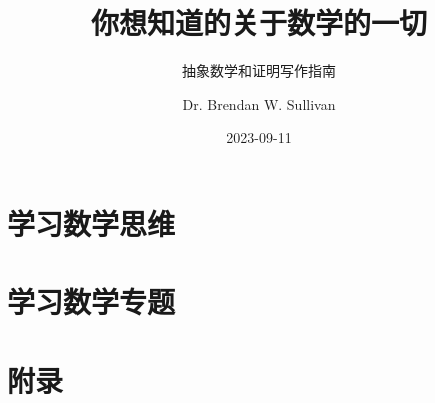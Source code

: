 \documentclass[lang=cn,color=green,10pt]{elegantbook}
\title{你想知道的关于数学的一切}
\subtitle{抽象数学和证明写作指南}
\author{Dr. Brendan W. Sullivan}
\date{2023-09-11}
\begin{document}
\maketitle
\frontmatter

\tableofcontents

\mainmatter

\part{学习数学思维}\label{part:Part One}








\part{学习数学专题}\label{part:Part Two}





\appendix

\part{附录}\label{part:Appendix}




\end{document}
